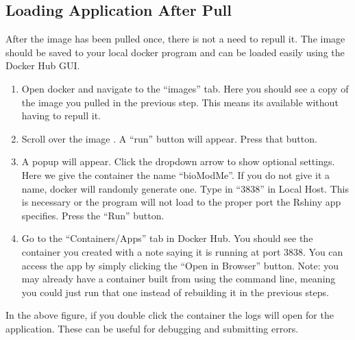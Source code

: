 \documentclass[letterpaper,10pt,english]{sphinxmanual}
\begin{document}
\subsection{Loading Application After Pull}
\label{\detokenize{pages/gettingStarted/docker:loading-application-after-pull}}
\sphinxAtStartPar
After the image has been pulled once, there is not a need to repull it.
The image should be saved to your local docker program and can be loaded
easily using the Docker Hub GUI.
\begin{enumerate}
%
\item {} 
\sphinxAtStartPar
Open docker and navigate to the “images” tab. Here you should see a copy
of the image you pulled in the previous step. This means its available
without having to repull it.

\item {} 
\sphinxAtStartPar
Scroll over the image . A “run” button will appear.
Press that button.

\noindent{}

\item {} 
\sphinxAtStartPar
A popup will appear.
Click the dropdown arrow to show optional settings.
Here we give the container the name “bioModMe”.
If you do not give it a name, docker will randomly generate one.
Type in “3838” in Local Host.
This is necessary or the program will not load to the proper port the
Rshiny app specifies. Press the “Run” button.


\item {} 
\sphinxAtStartPar
Go to the “Containers/Apps” tab in Docker Hub.
You should see the container you created with a note saying it is running
at port 3838.
You can access the app by simply clicking the “Open in Browser” button.
Note: you may already have a container built from using the command line,
meaning you could just run that one instead of rebuilding it in the previous
steps.

\noindent{}

\end{enumerate}

\sphinxAtStartPar
In the above figure, if you double click the container the logs will open for
the application. These can be useful for debugging and submitting errors.
\end{document}
